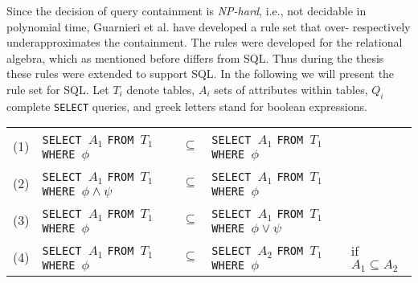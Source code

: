 Since the decision of query containment is \emph{NP-hard}, i.e., not decidable in polynomial time, Guarnieri et al. have developed a rule set that over- respectively underapproximates the containment.
%
The rules were developed for the relational algebra, which as mentioned before differs from SQL. 
%
Thus during the thesis these rules were extended to support SQL.
%
In the following we will present the rule set for SQL. 
%
Let $T_i$ denote tables, $A_i$ sets of attributes within tables, $Q_i$ complete \texttt{SELECT} queries, and greek letters stand for boolean expressions.
\newline
{\renewcommand{\arraystretch}{1.5}
\begin{center}
	\begin{tabular}{ p{5mm} p{40mm} p{5mm} p{25mm} p{25mm} }
	(1) \label{id} &
	\texttt{SELECT $A_1$} \newline
	\texttt{FROM $T_1$} \newline
	\texttt{WHERE $\phi$} &
	$\subseteq$ &
	\texttt{SELECT $A_1$} \newline
	\texttt{FROM $T_1$} \newline
	\texttt{WHERE $\phi$}&
	\\

	(2) \label{and} &
	\texttt{SELECT $A_1$} \newline
	\texttt{FROM $T_1$} \newline
	\texttt{WHERE $\phi \land \psi$} &
	$\subseteq$ &
	\texttt{SELECT $A_1$} \newline
	\texttt{FROM $T_1$} \newline
	\texttt{WHERE $\phi$}&
	\\
	
	(3) \label{or} &
	\texttt{SELECT $A_1$} \newline
	\texttt{FROM $T_1$} \newline
	\texttt{WHERE $\phi$} &
	$\subseteq$ &
	\texttt{SELECT $A_1$} \newline
	\texttt{FROM $T_1$} \newline
	\texttt{WHERE $\phi \lor \psi$}&
	\\
	
	(4) \label{proj} &
	\texttt{SELECT $A_1$} \newline
	\texttt{FROM $T_1$} \newline
	\texttt{WHERE $\phi$} &
	$\subseteq$ &
	\texttt{SELECT $A_2$} \newline
	\texttt{FROM $T_1$} \newline
	\texttt{WHERE $\phi$}&
	if $A_1 \subseteq A_2$
	\\
	

\end{tabular}
\end{center}}
